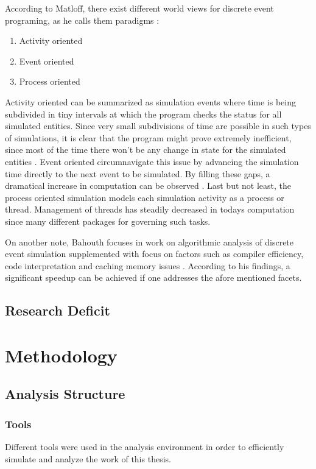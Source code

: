 \documentclass{seal_thesis}
\begin{document}
According to Matloff, there exist different world views for discrete event programing, as he calls them paradigms \cite{Matloff2008}:

\begin{enumerate}
	\item Activity oriented
	\item Event oriented
	\item Process oriented
\end{enumerate}

Activity oriented can be summarized as simulation events where time is being subdivided in tiny intervals at which the program checks the status for all simulated entities. Since very small subdivisions of time are possible in such types of simulations, it is clear that the program might prove extremely inefficient, since most of the time there won't be any change in state for the simulated entities \cite{Matloff2008}. Event oriented circumnavigate this issue by advancing the simulation time directly to the next event to be simulated. By filling these gaps, a dramatical increase in computation can be observed \cite{Matloff2008}. Last but not least, the process oriented simulation models each simulation activity as a process or thread. Management of threads has steadily decreased in todays computation since many different packages for governing such tasks.

On another note, Bahouth focuses in work on algorithmic analysis of discrete event simulation supplemented with focus on factors such as compiler efficiency, code interpretation and caching memory issues \cite{Bahouth2007}. According to his findings, a significant speedup can be achieved if one addresses the afore mentioned facets.

\section{Research Deficit}

\chapter{Methodology}
\label{ch:methodology}

\section{Analysis Structure}
\subsection{Tools}
Different tools were used in the analysis environment in order to efficiently simulate and analyze the work of this thesis.
\end{document}
